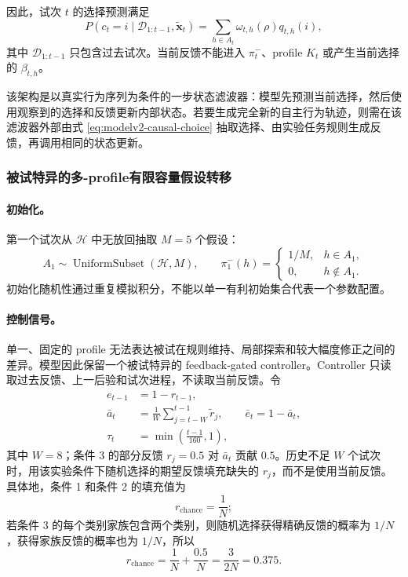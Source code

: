 因此，试次 $t$ 的选择预测满足
\begin{equation}
    P(c_t=i\mid\mathcal D_{1:t-1},\widetilde{\mathbf x}_t)
    =
    \sum_{h\in A_t}
    \omega_{t,h}(\rho)
    q_{t,h}(i),
    \label{eq:modelv2-causal-choice}
\end{equation}
其中 $\mathcal D_{1:t-1}$ 只包含过去试次。当前反馈不能进入 $\pi_t^-$、profile $K_t$ 或产生当前选择的 $\beta_{t,h}$。

该架构是以真实行为序列为条件的一步状态滤波器：模型先预测当前选择，然后使用观察到的选择和反馈更新内部状态。若要生成完全新的自主行为轨迹，则需在该滤波器外部由式 \ref{eq:modelv2-causal-choice} 抽取选择、由实验任务规则生成反馈，再调用相同的状态更新。


\subsubsection{被试特异的多-profile有限容量假设转移}

\paragraph{初始化。}
第一个试次从 $\mathcal H$ 中无放回抽取 $M=5$ 个假设：
\begin{equation}
    A_1\sim\operatorname{UniformSubset}(\mathcal H,M),
    \qquad
    \pi_1^-(h)=
    \begin{cases}
        1/M,&h\in A_1,\\
        0,&h\notin A_1.
    \end{cases}
    \label{eq:modelv2-initial-active-set}
\end{equation}
初始化随机性通过重复模拟积分，不能以单一有利初始集合代表一个参数配置。

\paragraph{控制信号。}
单一、固定的 profile 无法表达被试在规则维持、局部探索和较大幅度修正之间的差异。模型因此保留一个被试特异的 feedback-gated controller。Controller 只读取过去反馈、上一后验和试次进程，不读取当前反馈。令
\begin{align}
    e_{t-1}&=1-r_{t-1},\\
    \bar a_t
    &=
    \frac{1}{W}
    \sum_{j=t-W}^{t-1}\tilde r_j,
    \qquad
    \bar e_t=1-\bar a_t,\\
    \tau_t
    &=
    \min\left(\frac{t-1}{160},1\right),
    \label{eq:modelv2-controller-history}
\end{align}
其中 $W=8$；条件 3 的部分反馈 $r_j=0.5$ 对 $\bar a_t$ 贡献 $0.5$。历史不足 $W$ 个试次时，用该实验条件下随机选择的期望反馈填充缺失的 $r_j$，而不是使用当前反馈。
具体地，条件 1 和条件 2 的填充值为
\[
    r_{\mathrm{chance}}=\frac{1}{N};
\]
若条件 3 的每个类别家族包含两个类别，则随机选择获得精确反馈的概率为 $1/N$，获得家族反馈的概率也为 $1/N$，所以
\[
    r_{\mathrm{chance}}
    =
    \frac{1}{N}+\frac{0.5}{N}
    =
    \frac{3}{2N}
    =0.375 .
\]

